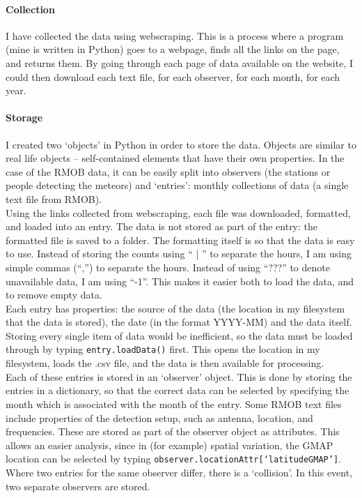 \paragraph{Collection\\}
I have collected the data using webscraping. This is a process where a program (mine is written in Python) goes to a webpage, finds all the links on the page, and returns them. By going through each page of data available on the website, I could then download each text file, for each observer, for each month, for each year.\\
\paragraph{Storage\\}
I created two `objects' in Python in order to store the data. Objects are similar to real life objects -- self-contained elements that have their own properties. In the case of the RMOB data, it can be easily split into observers (the stations or people detecting the meteors) and `entries': monthly collections of data (a single text file from RMOB).\\
Using the links collected from webscraping, each file was downloaded, formatted,  and loaded into an entry. The data is not stored as part of the entry: the formatted file is saved to a folder. The formatting itself is so that the data is easy to use. Instead of storing the counts using `` | '' to separate the hours, I am using simple commas (``,'') to separate the hours. Instead of using ``???'' to denote unavailable data, I am using ``-1''. This makes it easier both to load the data, and to remove empty data.\\
Each entry has properties: the source of the data (the location in my filesystem that the data is stored), the date (in the format YYYY-MM) and the data itself. Storing every single item of data would be inefficient, so the data must be loaded through by typing \texttt{entry.loadData()} first. This opens the location in my filesystem, loads the .csv file, and the data is then available for processing. \\
Each of these entries is stored in an `observer' object. This is done by storing the entries in a dictionary, so that the correct data can be selected by specifying the month which is associated with the month of the entry. Some RMOB text files include properties of the detection setup, such as antenna, location, and frequencies. These are stored as part of the observer object as attributes. This allows an easier analysis, since in (for example) spatial variation, the GMAP location can be selected by typing \texttt{observer.locationAttr[`latitudeGMAP']}. Where two entries for the same observer differ, there is a `collision'. In this event, two separate observers are stored.
